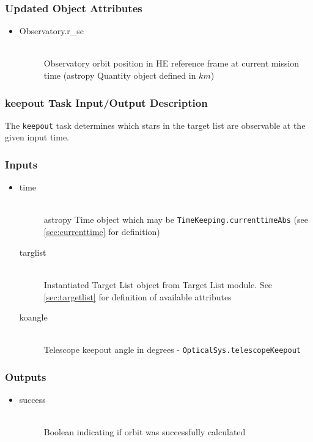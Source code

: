 \documentclass[cleanfoot]{asme2ej}
\begin{document}
\subsubsection*{Updated Object Attributes}
\begin{itemize}
    \item
    \begin{description}
        \item[Observatory.r\_sc] \hfill \\
        Observatory orbit position in HE reference frame at current mission time (astropy Quantity object defined in $ km $)
    \end{description}
\end{itemize}

\subsubsection{keepout Task Input/Output Description} \label{sec:keepouttask} 
The \verb+keepout+ task determines which stars in the target list are observable at the given input time.

\subsubsection*{Inputs}
\begin{itemize}
    \item
    \begin{description}
        \item[time] \hfill \\
        astropy Time object which may be \verb+TimeKeeping.currenttimeAbs+ (see \ref{sec:currenttime} for definition)
        \item[targlist] \hfill \\
        Instantiated Target List object from Target List module. See \ref{sec:targetlist} for definition of available attributes
        \item[koangle] \hfill \\
        Telescope keepout angle in degrees - \verb+OpticalSys.telescopeKeepout+
    \end{description}
\end{itemize}

\subsubsection*{Outputs}
\begin{itemize}
    \item
    \begin{description}
        \item[success] \hfill \\
        Boolean indicating if orbit was successfully calculated
    \end{description}
\end{itemize}
\end{document}
